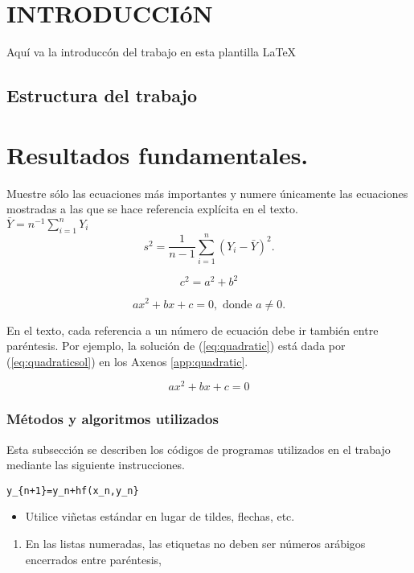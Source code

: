 \documentclass{wscpaperproc}
\theoremstyle{wsc}
\begin{document}
\section{INTRODUCCIóN}
\label{sec:intro}
Aqu\'i va la introduccón del trabajo en esta plantilla  \LaTeX\
\subsection{Estructura del trabajo}

\section{Resultados fundamentales.}

Muestre sólo las ecuaciones más importantes y numere \'unicamente las ecuaciones mostradas a las que se hace referencia expl\'icita en el texto. \\

$\bar Y = n^{-1} \sum_{i=1}^n Y_i$\\
$$s^2 = \frac 1 {n-1} \sum_{i=1}^n (Y_i - \bar Y)^2.$$

\[
	c^2=a^2+b^2
\]

\begin{equation}\label{eq:quadratic}
	ax^2 + bx + c = 0, \mbox{ donde } a \ne 0.
\end{equation}

En el texto, cada referencia a un n\'umero de ecuación debe ir tambi\'en entre par\'entesis. Por ejemplo, la solución de (\ref{eq:quadratic}) está dada por  (\ref{eq:quadraticsol}) en los Axenos \ref{app:quadratic}.


\begin{equation} \label{eq:quadratic_second}
	ax^2 + bx + c = 0
\end{equation}

\subsubsection{M\'etodos y algoritmos utilizados}
Esta  subsección se describen los códigos de programas utilizados en el trabajo mediante las siguiente instrucciones.

\begin{verbatim}
y_{n+1}=y_n+hf(x_n,y_n}
\end{verbatim}


\begin{itemize}
	\item Utilice vi\~netas estándar en lugar de tildes, flechas, etc.
\end{itemize}
\begin{enumerate}
	\item En las listas numeradas, las etiquetas no deben ser n\'umeros arábigos encerrados entre par\'entesis, \cite{simulation}
\end{enumerate}
\end{document}

